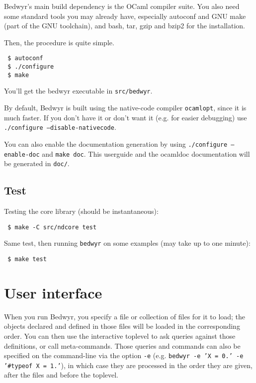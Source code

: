 Bedwyr's main build dependency is the OCaml compiler suite.
You also need some standard tools you may already have, especially
autoconf and GNU make (part of the GNU toolchain),
and bash, tar, gzip and bzip2 for the installation.

Then, the procedure is quite simple.

\begin{verbatim}
 $ autoconf
 $ ./configure
 $ make
\end{verbatim}

You'll get the bedwyr executable in \texttt{src/bedwyr}.

By default, Bedwyr is built using the native-code compiler \texttt{ocamlopt},
since it is much faster. If you don't have it or don't want it (e.g.
for easier debugging) use \texttt{./configure --disable-nativecode}.

You can also enable the documentation generation by using
\texttt{./configure --enable-doc} and \texttt{make doc}. This userguide
and the ocamldoc documentation will be generated in \texttt{doc/}.

\subsection{Test}

Testing the core library (should be instantaneous):
\begin{verbatim}
 $ make -C src/ndcore test
\end{verbatim}
Same test, then running {\tt bedwyr} on some examples (may take up to
one minute):
\begin{verbatim}
 $ make test
\end{verbatim}


\section{User interface}

When you run Bedwyr, you specify a file or collection of files for it to
load; the objects declared and defined in those files will be loaded in
the corresponding order. You can then use the interactive toplevel to
ask queries against those definitions, or call meta-commands.
Those queries and commands can also be specified on the command-line via
the option \verb.-e. (e.g.
\texttt{bedwyr -e 'X = 0.' -e '\#typeof X = 1.'}), in which case they are
processed in the order they are given, after the files and before the
toplevel.

